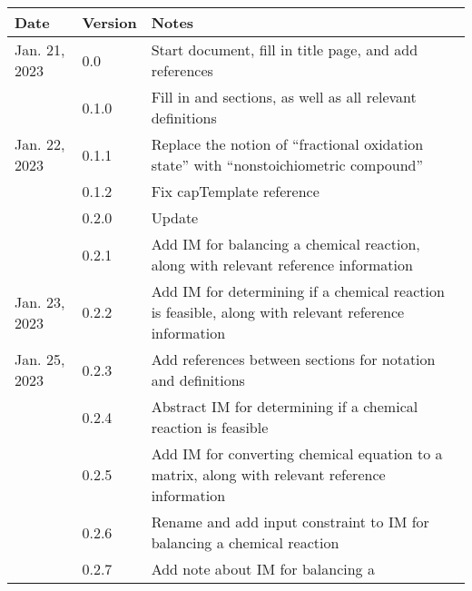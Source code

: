 \documentclass[12pt]{article}
\begin{document}
\begin{tabularx}{\textwidth}{p{2.5cm}p{1.5cm}X}
  \toprule {\bf Date} & {\bf Version} & {\bf Notes}                                                          \\
  \midrule
  Jan. 21, 2023       & 0.0           & Start document, fill in title page, and add references               \\
                      & 0.1.0         & Fill in \nameref{sec_probDesc} and \nameref{sec_goals} sections, as
  well as all relevant definitions                                                                           \\
  Jan. 22, 2023       & 0.1.1         & Replace the notion of ``fractional oxidation state'' with
  ``nonstoichiometric compound''                                                                             \\
                      & 0.1.2         & Fix capTemplate reference                                            \\
                      & 0.2.0         & Update \nameref{srs_sec_abbsAcrs}                                    \\
                      & 0.2.1         & Add IM for balancing a chemical
  reaction, along with relevant reference information                                                        \\
  Jan. 23, 2023       & 0.2.2         & Add IM for determining if a chemical
  reaction is feasible, along with relevant reference information                                            \\
  Jan. 25, 2023       & 0.2.3         & Add references between sections for notation and
  definitions                                                                                                \\
                      & 0.2.4         & Abstract IM for determining if a
  chemical reaction is feasible                                                                              \\
                      & 0.2.5         & Add IM for converting chemical
  equation to a matrix, along with relevant reference information                                            \\
                      & 0.2.6         & Rename and add input constraint to
  IM for balancing a chemical reaction                                                                       \\
                      & 0.2.7         & Add note about IM for balancing a

\end{tabularx}
\end{document}

